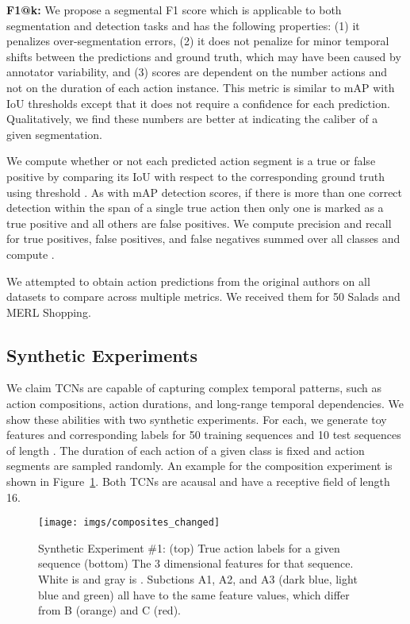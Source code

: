 \documentclass[10pt,twocolumn,letterpaper]{article}
\newcommand{\fakesubsection}[1]{\smallskip\noindent\textbf{#1:}}
\begin{document}
\fakesubsection{F1@k}
We propose a segmental F1 score which is applicable to both segmentation and detection tasks and has the following properties:
(1) it penalizes over-segmentation errors, (2) it does not penalize for minor temporal shifts between the predictions and ground truth, which may have been caused by annotator variability, and (3) scores are dependent on the number actions and not on the duration of each action instance. 
This metric is similar to mAP with IoU thresholds except that it does not require a confidence for each prediction. 
Qualitatively, we find these numbers are better at indicating the caliber of a given segmentation. 

We compute whether or not each predicted action segment is a true or false positive by comparing its IoU with respect to the corresponding ground truth using threshold . 
As with mAP detection scores, if there is more than one correct detection within the span of a single true action then only one is marked as a true positive and all others are false positives. We compute precision and recall for true positives, false positives, and false negatives summed over all classes and compute 
. 


We attempted to obtain action predictions from the original authors on all datasets to compare across multiple metrics. We received them for 50 Salads and MERL Shopping.









\subsection{Synthetic Experiments}
We claim TCNs are capable of capturing complex temporal patterns, such as action compositions, action durations, and long-range temporal dependencies. We show these abilities with two synthetic experiments. 
For each, we generate toy features  and corresponding labels  for 50 training sequences and 10 test sequences of length . The duration of each action of a given class is fixed and action segments are sampled randomly. An example for the composition experiment is shown in Figure~\ref{fig:composites}.
Both TCNs are acausal and have a receptive field of length 16.


\begin{figure}
	\center
	\texttt{[image: imgs/composites\_changed]}
	\caption{Synthetic Experiment \#1: (top) True action labels for a given sequence (bottom) The 3 dimensional features for that sequence. White is  and gray is . Subctions A1, A2, and A3 (dark blue, light blue and green) all have to the same feature values, which differ from B (orange) and C (red).}
	\label{fig:composites}
\end{figure}
\end{document}
